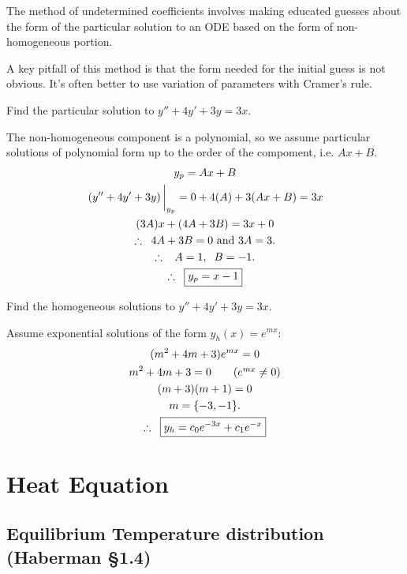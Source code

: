 The method of undetermined coefficients involves making educated guesses about the form of the particular solution to an ODE based on the form of non-homogeneous portion. 

A key pitfall of this method is that the form needed for the initial guess is not obvious. It's often better to use variation of parameters with Cramer's rule. 

\begin{quest}
	\item Find the particular solution to $y'' + 4y' + 3y = 3x$. 
	\begin{ans}
		The non-homogeneous component is a polynomial, so we assume particular solutions of polynomial form up to the order of the compoment, i.e. $Ax + B$.
		\begin{gather*}
			y_p = Ax + B \\
			\eval{\left( y'' + 4y' + 3y \right) }_{y_p} 
				= 0 + 4(A) + 3(Ax+ B) = 3x \\
			(3A)x + (4A + 3B) = 3x + 0 \\
			\therefore \;\; 4A + 3B = 0 \text{ and } 3A = 3.\\
			\therefore \;\;\; A = 1,\;\; B = -1. \\
		\therefore \;\; \boxed{ y_p = x - 1 } 
		\end{gather*}
	\end{ans}
	
	\item Find the homogeneous solutions to $y'' + 4y' + 3y = 3x$. 
	\begin{ans}
		Assume exponential solutions of the form $y_h(x) = e^{mx}$: 
		\begin{gather*}
			(m^2 + 4m + 3) e^{mx} = 0 \\
			m^2 + 4m + 3 = 0 \tag{$e^{mx} \neq 0$}\\
			(m + 3)(m + 1) = 0 \\
			m = \{-3, -1\}. \\ 
			\therefore \;\; \boxed{y_h = c_0 e^{-3x} + c_1 e^{-x}}
		\end{gather*}
	\end{ans}
\end{quest}

\chapter{Heat Equation}


\section{Equilibrium Temperature distribution (Haberman \S 1.4)}


